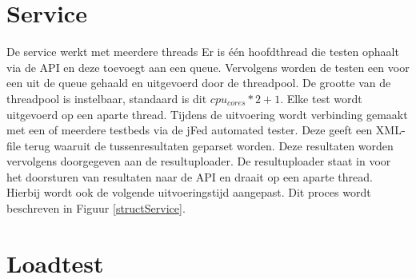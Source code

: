 \section{Service}
\npar
De service werkt met meerdere threads Er is \'e\'en hoofdthread die testen ophaalt via de API en deze toevoegt aan een queue. Vervolgens worden de testen een voor een uit de queue gehaald en uitgevoerd door de threadpool. De grootte van de threadpool is instelbaar, standaard is dit $cpu_{cores} * 2 + 1$.
\npar
Elke test wordt uitgevoerd op een aparte thread. Tijdens de uitvoering wordt verbinding gemaakt met een of meerdere testbeds via de jFed automated tester. Deze geeft een XML-file terug waaruit de tussenresultaten geparset worden. Deze resultaten worden vervolgens doorgegeven aan de resultuploader.
\npar
De resultuploader staat in voor het doorsturen van resultaten naar de API en draait op een aparte thread. Hierbij wordt ook de volgende uitvoeringstijd aangepast. Dit proces wordt beschreven in Figuur \ref{structService}.


\clearpage

\section{Loadtest}
